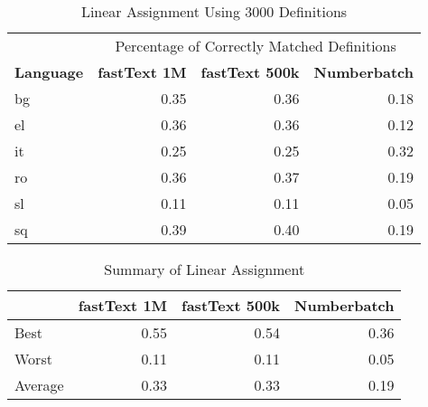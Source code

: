 \begin{table}[htbp]
    \centering
    \begin{tabular}{lrrr}
        \toprule
& \multicolumn{3}{c}{Percentage of Correctly Matched Definitions} \\
\cmidrule(lr){2-4}
        \textbf{Language} & \textbf{fastText 1M} & \textbf{fastText 500k} & \textbf{Numberbatch} \\
        bg & 0.35 & 0.36 & 0.18 \\
        el & 0.36 & 0.36 & 0.12 \\
        it & 0.25 & 0.25 & 0.32 \\
        ro & 0.36 & 0.37 & 0.19 \\
        sl & 0.11 & 0.11 & 0.05 \\
        sq & 0.39 & 0.40 & 0.19 \\
        \bottomrule
    \end{tabular}
    \caption{Linear Assignment Using 3000 Definitions}%
    \label{tab:lapjv_3000}
\end{table}

\begin{table}[htbp]
    \centering
    \begin{tabular}{lrrr}
        \toprule
& \textbf{fastText 1M} & \textbf{fastText 500k} & \textbf{Numberbatch} \\
\midrule
        Best & 0.55 & 0.54 & 0.36 \\
        Worst & 0.11 & 0.11 & 0.05 \\
        Average & 0.33 & 0.33 & 0.19 \\
        \bottomrule
    \end{tabular}
    \caption{Summary of Linear Assignment}%
    \label{tab:lapjv_summary}
\end{table}
